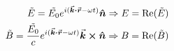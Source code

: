 

\vspace*{\fill}
\centering

\begin{align*}
    \tilde{E} = \tilde{E_{0}} e^{i(\va*{k} \vdot \va*{r} - \omega t)} \vu*{n} \Rightarrow E = {\rm Re}(\tilde{E}) \\
    \tilde{B} = \frac{\tilde{E_{0}}}{c} e^{i(\va*{k} \vdot \va*{r} - \omega t)} \va*{k} \cross \vu*{n} \Rightarrow B = {\rm Re}(\tilde{B})
\end{align*}

\centering
\vspace*{\fill}


